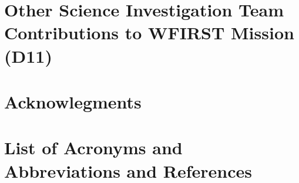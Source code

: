 \documentclass[letter]{ar-1col_WFIRST-HLS}
\newcommand{\Oli}[1]{\textcolor{red}{[{\bf Oli}: #1]}}
\begin{document}
%

\section{Other Science Investigation Team Contributions to WFIRST Mission (D11)}
\label{sec:other_contributions}


\section*{Acknowlegments}
\label{sec:acknowledgments}


\newpage

\section*{List of Acronyms and Abbreviations and References}
\label{sec:acronyms}
\vspace{2 cm}


\clearpage
\newpage


%



\clearpage
\newpage
\end{document}
